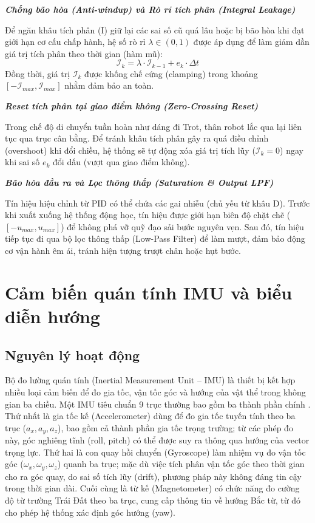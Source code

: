 \textbf{\textit{Chống bão hòa (Anti-windup) và Rò rỉ tích phân (Integral Leakage)}}

Để ngăn khâu tích phân (I) giữ lại các sai số cũ quá lâu hoặc bị bão hòa khi đạt giới hạn cơ cấu chấp hành, hệ số rò rỉ $\lambda \in (0, 1)$ được áp dụng để làm giảm dần giá trị tích phân theo thời gian (hàm mũ):
\begin{equation}
    \mathcal{I}_k = \lambda \cdot \mathcal{I}_{k-1} + e_k \cdot \Delta t
\end{equation}
Đồng thời, giá trị $\mathcal{I}_k$ được khống chế cứng (clamping) trong khoảng $[-\mathcal{I}_{max}, \mathcal{I}_{max}]$ nhằm đảm bảo an toàn.

\textbf{\textit{Reset tích phân tại giao điểm không (Zero-Crossing Reset)}}

Trong chế độ di chuyển tuần hoàn như dáng đi Trot, thân robot lắc qua lại liên tục qua trục cân bằng. Để tránh khâu tích phân gây ra quá điều chỉnh (overshoot) khi đổi chiều, hệ thống sẽ tự động xóa giá trị tích lũy ($\mathcal{I}_k = 0$) ngay khi sai số $e_k$ đổi dấu (vượt qua giao điểm không).

\textbf{\textit{Bão hòa đầu ra và Lọc thông thấp (Saturation \& Output LPF)}}

Tín hiệu hiệu chỉnh từ PID có thể chứa các gai nhiễu (chủ yếu từ khâu D). Trước khi xuất xuống hệ thống động học, tín hiệu được giới hạn biên độ chặt chẽ ($[-u_{max}, u_{max}]$) để không phá vỡ quỹ đạo sải bước nguyên vẹn. Sau đó, tín hiệu tiếp tục đi qua bộ lọc thông thấp (Low-Pass Filter) để làm mượt, đảm bảo động cơ vận hành êm ái, tránh hiện tượng trượt chân hoặc hụt bước.

\section{Cảm biến quán tính IMU và biểu diễn hướng}

\subsection{Nguyên lý hoạt động}

Bộ đo lường quán tính (Inertial Measurement Unit -- IMU) là thiết bị kết hợp nhiều loại cảm biến để đo gia tốc, vận tốc góc và hướng của vật thể trong không gian ba chiều. Một IMU tiêu chuẩn 9 trục thường bao gồm ba thành phần chính \cite{madgwick2011}. Thứ nhất là gia tốc kế (Accelerometer) dùng để đo gia tốc tuyến tính theo ba trục ($a_x, a_y, a_z$), bao gồm cả thành phần gia tốc trọng trường; từ các phép đo này, góc nghiêng tĩnh (roll, pitch) có thể được suy ra thông qua hướng của vector trọng lực. Thứ hai là con quay hồi chuyển (Gyroscope) làm nhiệm vụ đo vận tốc góc ($\omega_x, \omega_y, \omega_z$) quanh ba trục; mặc dù việc tích phân vận tốc góc theo thời gian cho ra góc quay, do sai số tích lũy (drift), phương pháp này không đáng tin cậy trong thời gian dài. Cuối cùng là từ kế (Magnetometer) có chức năng đo cường độ từ trường Trái Đất theo ba trục, cung cấp thông tin về hướng Bắc từ, từ đó cho phép hệ thống xác định góc hướng (yaw).

